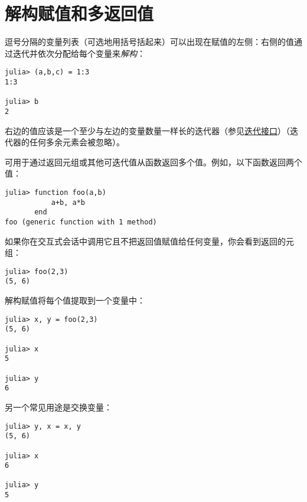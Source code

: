 \hypertarget{14913135952669439020}{}


\section{解构赋值和多返回值}



逗号分隔的变量列表（可选地用括号括起来）可以出现在赋值的左侧：右侧的值通过迭代并依次分配给每个变量来\emph{解构}：




\begin{verbatim}
julia> (a,b,c) = 1:3
1:3

julia> b
2
\end{verbatim}



右边的值应该是一个至少与左边的变量数量一样长的迭代器（参见\hyperlink{3897660032678469808}{迭代接口}）（迭代器的任何多余元素会被忽略）。



可用于通过返回元组或其他可迭代值从函数返回多个值。例如，以下函数返回两个值：




\begin{verbatim}
julia> function foo(a,b)
           a+b, a*b
       end
foo (generic function with 1 method)
\end{verbatim}



如果你在交互式会话中调用它且不把返回值赋值给任何变量，你会看到返回的元组：




\begin{verbatim}
julia> foo(2,3)
(5, 6)
\end{verbatim}



解构赋值将每个值提取到一个变量中：




\begin{verbatim}
julia> x, y = foo(2,3)
(5, 6)

julia> x
5

julia> y
6
\end{verbatim}



另一个常见用途是交换变量：




\begin{verbatim}
julia> y, x = x, y
(5, 6)

julia> x
6

julia> y
5
\end{verbatim}



